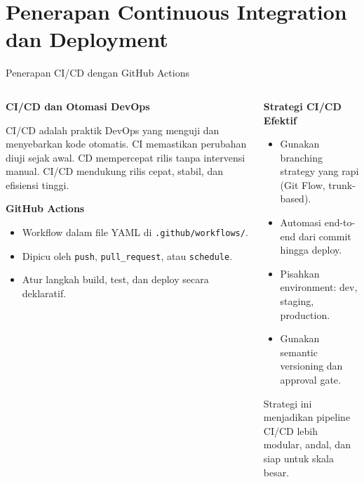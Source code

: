\documentclass[aspectratio=169, table]{beamer}
\begin{document}
\section{Penerapan Continuous Integration dan Deployment}

\begin{frame}[fragile]{Penerapan CI/CD dengan GitHub Actions}
	\vspace{20pt}
	
	\begin{columns}[T]
		\begin{column}{0.56\textwidth}
			\textbf{CI/CD dan Otomasi DevOps}
			
			CI/CD adalah praktik DevOps yang menguji dan menyebarkan kode otomatis. CI memastikan perubahan diuji sejak awal. CD mempercepat rilis tanpa intervensi manual. CI/CD mendukung rilis cepat, stabil, dan efisiensi tinggi.
			
			\vspace{6pt}
			\textbf{GitHub Actions}
			\begin{itemize}
				\item Workflow dalam file YAML di \texttt{.github/workflows/}.
				\item Dipicu oleh \texttt{push}, \texttt{pull\_request}, atau \texttt{schedule}.
				\item Atur langkah build, test, dan deploy secara deklaratif.
			\end{itemize}
		\end{column}
		
		\begin{column}{0.44\textwidth}
			\textbf{Strategi CI/CD Efektif}
			\begin{itemize}
				\item Gunakan branching strategy yang rapi (Git Flow, trunk-based).
				\item Automasi end-to-end dari commit hingga deploy.
				\item Pisahkan environment: dev, staging, production.
				\item Gunakan semantic versioning dan approval gate.
			\end{itemize}
			
			\vspace{8pt}
			Strategi ini menjadikan pipeline CI/CD lebih modular, andal, dan siap untuk skala besar.
		\end{column}
	\end{columns}
\end{frame}
\end{document}
